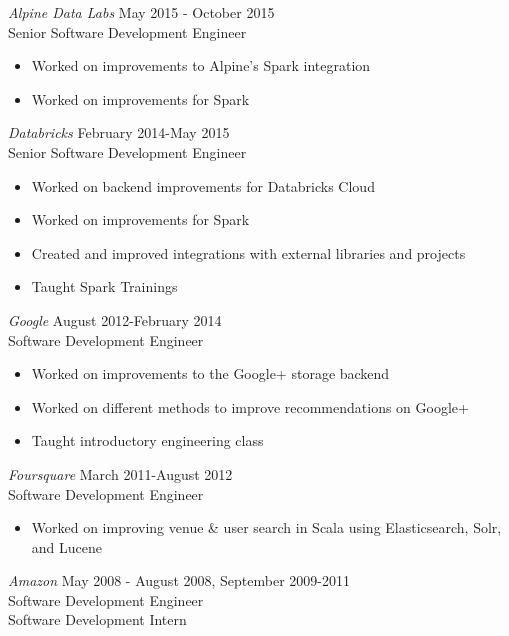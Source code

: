 \documentclass[10pt,line,margin=0.1]{newsres}
\begin{document}
\begin{resume}
        {\sl Alpine Data Labs} \hfill May 2015 - October 2015\\
        Senior Software Development Engineer
        \begin{itemize}  \itemsep -2pt %
          \item Worked on improvements to Alpine's Spark integration
          \item Worked on improvements for Spark
        \end{itemize}
      {\sl Databricks} \hfill February 2014-May 2015\\
        Senior Software Development Engineer
        \begin{itemize}  \itemsep -2pt %
          \item Worked on backend improvements for Databricks Cloud
          \item Worked on improvements for Spark
          \item Created and improved integrations with external libraries and projects
          \item Taught Spark Trainings
        \end{itemize}
        {\sl Google} \hfill August 2012-February 2014\\
        Software Development Engineer
        \begin{itemize}  \itemsep -2pt %
          \item Worked on improvements to the Google+ storage backend
          \item Worked on different methods to improve recommendations on Google+
          \item Taught introductory engineering class
        \end{itemize}
        {\sl Foursquare} \hfill March 2011-August 2012\\
        Software Development Engineer
        \begin{itemize}  \itemsep -2pt %
        \item Worked on improving venue \& user search in Scala using Elasticsearch, Solr, and Lucene
        \end{itemize}
        {\sl Amazon} \hfill            May 2008 - August 2008, September 2009-2011 \\
        Software Development Engineer \\
        Software Development Intern
        \begin{itemize}  \itemsep -2pt %

\end{itemize}
\end{resume}
\end{document}
